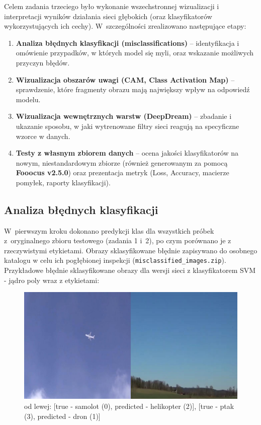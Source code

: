 
\label{sec:z3}

Celem zadania trzeciego było wykonanie wszechstronnej wizualizacji i interpretacji wyników działania sieci głębokich (oraz klasyfikatorów wykorzystujących ich cechy). W~szczególności zrealizowano następujące etapy:
\begin{enumerate}
    \item \textbf{Analiza błędnych klasyfikacji (misclassifications)} -- identyfikacja i omówienie przypadków, w których model się myli, oraz wskazanie możliwych przyczyn błędów.
    \item \textbf{Wizualizacja obszarów uwagi (CAM, Class Activation Map)} -- sprawdzenie, które fragmenty obrazu mają największy wpływ na odpowiedź modelu.
    \item \textbf{Wizualizacja wewnętrznych warstw (DeepDream)} -- zbadanie i ukazanie sposobu, w jaki wytrenowane filtry sieci reagują na specyficzne wzorce w danych.
    \item \textbf{Testy z własnym zbiorem danych} -- ocena jakości klasyfikatorów na nowym, niestandardowym zbiorze (również generowanym za pomocą \textbf{Fooocus v2.5.0}) oraz prezentacja metryk (Loss, Accuracy, macierze pomyłek, raporty klasyfikacji).
\end{enumerate}

\subsection{Analiza błędnych klasyfikacji}
W~pierwszym kroku dokonano predykcji klas dla wszystkich próbek z~oryginalnego zbioru testowego (zadania 1 i~2), po czym porównano je z rzeczywistymi etykietami. Obrazy sklasyfikowane błędnie zapisywano do osobnego katalogu w celu ich pogłębionej inspekcji (\texttt{misclassified\_images.zip}). 
Przykładowe błędnie sklasyfikowane obrazy dla wersji sieci z klasyfikatorem SVM - jądro poly wraz z etykietami:
\begin{figure}[H]
    \centering
    \includegraphics[width=1\textwidth]{img/zad3/bledy.png}
    \caption{ od lewej: [true - samolot (0), predicted - helikopter (2)], [true - ptak (3), predicted - dron (1)]}
    \label{fig:z3_misclass}
\end{figure}

